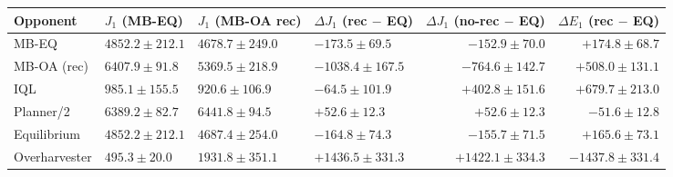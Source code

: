 \begin{tabular}{llllrr}
\toprule
Opponent & $J_1$ (MB-EQ) & $J_1$ (MB-OA rec) & $\Delta J_1$ (rec $-$ EQ) & $\Delta J_1$ (no-rec $-$ EQ) & $\Delta E_1$ (rec $-$ EQ) \\
\midrule
MB-EQ & $\mathbf{4852.2 \pm 212.1}$ & $4678.7 \pm 249.0$ & $-173.5 \pm 69.5$ & $-152.9 \pm 70.0$ & $+174.8 \pm 68.7$ \\
MB-OA (rec) & $\mathbf{6407.9 \pm 91.8}$ & $5369.5 \pm 218.9$ & $-1038.4 \pm 167.5$ & $-764.6 \pm 142.7$ & $+508.0 \pm 131.1$ \\
IQL & $985.1 \pm 155.5$ & $920.6 \pm 106.9$ & $-64.5 \pm 101.9$ & $\mathbf{+402.8 \pm 151.6}$ & $+679.7 \pm 213.0$ \\
Planner/2 & $6389.2 \pm 82.7$ & $6441.8 \pm 94.5$ & $+52.6 \pm 12.3$ & $\mathbf{+52.6 \pm 12.3}$ & $-51.6 \pm 12.8$ \\
Equilibrium & $\mathbf{4852.2 \pm 212.1}$ & $4687.4 \pm 254.0$ & $-164.8 \pm 74.3$ & $-155.7 \pm 71.5$ & $+165.6 \pm 73.1$ \\
Overharvester & $495.3 \pm 20.0$ & $\mathbf{1931.8 \pm 351.1}$ & $\mathbf{+1436.5 \pm 331.3}$ & $+1422.1 \pm 334.3$ & $-1437.8 \pm 331.4$ \\
\bottomrule
\end{tabular}
